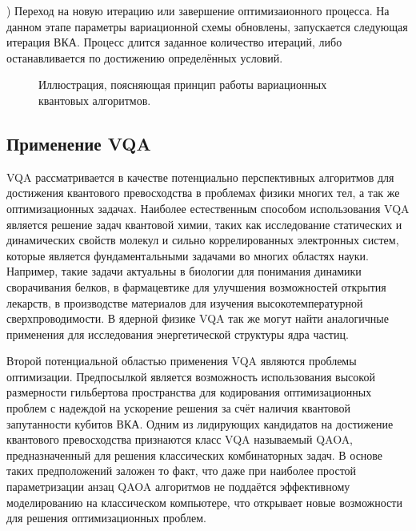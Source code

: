 \documentclass[12pt]{extarticle}
\begin{document}
) Переход на новую итерацию или завершение оптимизаионного процесса. На данном этапе параметры вариационной схемы обновлены, запускается следующая итерация ВКА. Процесс длится заданное количество итераций, либо останавливается по достижению определённых условий.

\bigskip

\begin{figure}[H]
\caption{Иллюстрация, поясняющая принцип работы вариационных квантовых алгоритмов.}\label{fig:VQA}
\end{figure}

\bigskip


\subsection{Применение VQA}

\qquad VQA рассматривается в качестве потенциально перспективных алгоритмов для достижения квантового превосходства в проблемах физики многих тел, а так же оптимизационных задачах. Наиболее естественным способом использования VQA является решение задач квантовой химии, таких как исследование статических и динамических свойств молекул и сильно коррелированных электронных систем, которые является фундаментальными задачами во многих областях науки. Например, такие задачи актуальны в биологии для понимания динамики сворачивания белков, в фармацевтике для улучшения возможностей открытия лекарств, в производстве материалов для изучения высокотемпературной сверхпроводимости. В ядерной физике VQA так же могут найти аналогичные применения для исследования энергетической структуры ядра частиц. 

\qquad Второй потенциальной областью применения VQA являются проблемы оптимизации. Предпосылкой является возможность использования высокой размерности гильбертова пространства для кодирования оптимизационных проблем с надеждой на ускорение решения за счёт наличия квантовой запутанности кубитов ВКА. Одним из лидирующих кандидатов на достижение квантового превосходства признаются класс VQA называемый QAOA, предназначенный для решения классических комбинаторных задач. В основе таких предположений заложен то факт, что даже при наиболее простой параметризации анзац QAOA алгоритмов не поддаётся эффективному моделированию на классическом компьютере, что открывает новые возможности для решения оптимизационных проблем.
\end{document}
